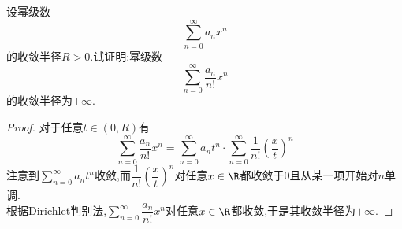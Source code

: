 \documentclass{ctexart}
\begin{document}
\begin{problem}[L.11.4]
    设幂级数
    \[\sum_{n=0}^\infty a_nx^n\]
    的收敛半径$R>0$.试证明:幂级数
    \[\sum_{n=0}^\infty\dfrac{a_n}{n!}x^n\]
    的收敛半径为$+\infty$.
\end{problem}
\begin{proof}
    对于任意$t\in(0,R)$有
    \[\sum_{n=0}^\infty\dfrac{a_n}{n!}x^n
    =\sum_{n=0}^\infty a_nt^n\cdot\sum_{n=0}^\infty\dfrac{1}{n!}\left(\dfrac{x}{t}\right)^n\]
    注意到$\displaystyle\sum_{n=0}^\infty a_nt^n$收敛,而$\dfrac{1}{n!}\left(\dfrac xt\right)^n$对任意$x\in\R$都收敛于$0$且从某一项开始对$n$单调.\\
    根据Dirichlet判别法,$\displaystyle\sum_{n=0}^\infty\dfrac{a_n}{n!}x^n$对任意$x\in\R$都收敛,于是其收敛半径为$+\infty$.
\end{proof}
\end{document}
